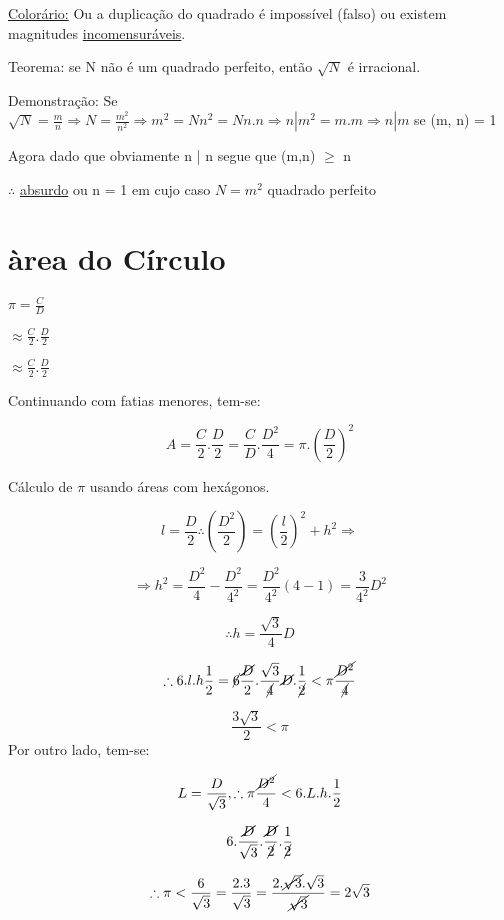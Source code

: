 \documentclass[a4paper, 12pt]{article}
\begin{document}
\underline{Colorário:} Ou a duplicação do quadrado é impossível (falso) ou existem magnitudes \underline{incomensuráveis}.

Teorema: se N não é um quadrado perfeito, então $\sqrt{N}$ é irracional.

Demonstração: Se $\sqrt{N} = \frac{m}{n} \Rightarrow N = \frac{m^2}{n^2} \Rightarrow m^2 = Nn^2 = Nn.n \Rightarrow n | m^2 = m.m \Rightarrow n | m$ se (m, n) = 1 

Agora dado que obviamente n | n segue que (m,n) $\ge$ n

$\therefore$ \underline{absurdo} ou n = 1 em cujo caso $N = m^2$ quadrado perfeito

\section{àrea do Círculo}

$\pi = \frac{C}{D}$

$\approx\frac{C}{2}.\frac{D}{2}$

$\approx\frac{C}{2}.\frac{D}{2}$

Continuando com fatias menores, tem-se:

\[
A = \frac{C}{2}.\frac{D}{2} = \frac{C}{D}.\frac{D^2}{4} = \pi.(\frac{D}{2})^2
\]

Cálculo de $\pi$ usando áreas com hexágonos.

\[
l = \frac{D}{2} \therefore (\frac{D^2}{2}) = (\frac{l}{2})^2 + h^2 \Rightarrow 
\]

\[
\Rightarrow h^2 = \frac{D^2}{4} - \frac{D^2}{4^2} = \frac{D^2}{4^2} (4-1) = \frac{3}{4^2}D^2
\]

\[
\therefore h= \frac{\sqrt{3}}{4}D
\]

\[
\therefore 6.l.h\frac{1}{2} = \cancel{6} \frac{\cancel{D}}{2}.\frac{\sqrt{3}}{\cancel{4}}\cancel{D}.\frac{1}{\cancel{2}} < \pi\frac{\cancel{D^2}}{\cancel{4}}
\]

\[
\frac{3\sqrt{3}}{2} < \pi
\]
Por outro lado, tem-se:

\[
L= \frac{D}{\sqrt{3}}, \therefore \pi \frac{\cancel{D^2}}{4} < 6.L.h.\frac{1}{2}
\]

\[
6.\frac{\cancel{D}}{\sqrt{3}}.\frac{\cancel{D}}{\cancel{2}}.\frac{1}{\cancel{2}}
\]

\[
\therefore \pi < \frac{6}{\sqrt{3}} = \frac{2.3}{\sqrt{3}} = \frac{2.\cancel{\sqrt{3}}.\sqrt{3}}{\cancel{\sqrt{3}}} = 2\sqrt{3}
\]
\end{document}
